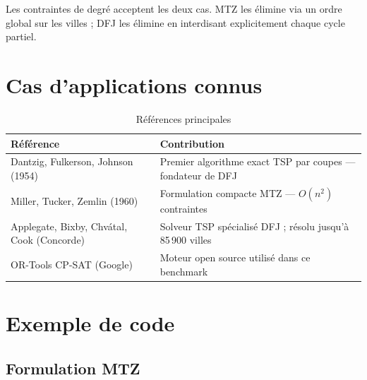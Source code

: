 \documentclass[12pt, a4paper]{article}
\begin{document}
Les contraintes de degré acceptent les deux cas. MTZ les élimine via un ordre
global sur les villes ; DFJ les élimine en interdisant explicitement chaque cycle partiel.

\section{Cas d'applications connus}

\begin{table}[h]
  \centering
  \begin{tabular}{ll}
    \toprule
    \textbf{Référence} & \textbf{Contribution} \\
    \midrule
    Dantzig, Fulkerson, Johnson (1954)           & Premier algorithme exact TSP par coupes --- fondateur de DFJ \\
    Miller, Tucker, Zemlin (1960)                & Formulation compacte MTZ --- $O(n^2)$ contraintes \\
    Applegate, Bixby, Chvátal, Cook (Concorde)   & Solveur TSP spécialisé DFJ ; résolu jusqu'à 85\,900 villes \\
    OR-Tools CP-SAT (Google)                     & Moteur open source utilisé dans ce benchmark \\
    \bottomrule
  \end{tabular}
  \caption{Références principales}
\end{table}

\section{Exemple de code}

\subsection{Formulation MTZ}
\end{document}
